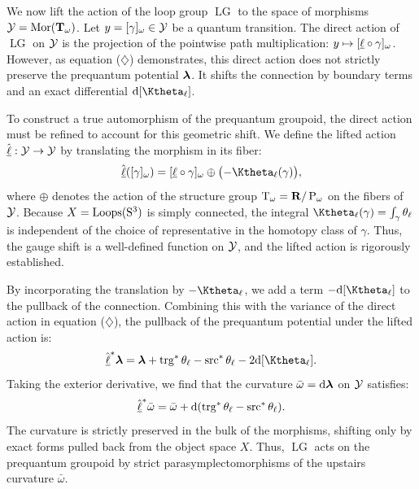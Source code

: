 \documentclass[11pt,reqno,letterpaper,twoside]{amsart}
\renewcommand{\TT}{\Groupoid{T}}
\def\u(#1){\uline{#1}}
\newcommand{\LG}{\operatorname{LG}}
\begin{document}
  We now lift the action of the loop group $\LG$ to the space of morphisms $\cY = \Mor(\TT_\omega)$.
  Let $y = [\gamma]_\omega \in \mathcal{Y}$ be a quantum transition.
  The direct action of $\LG$ on $\mathcal{Y}$ is the projection of the pointwise path multiplication:
  $y \mapsto [\u(\ell) \circ \gamma]_\omega$.
  However,
  as equation ($\diamondsuit$) demonstrates,
  this direct action does not strictly preserve the prequantum potential $\boldsymbol \lambda$.
  It shifts the connection by boundary terms and an exact differential $\der[\Ktheta_\ell]$.
  
  To construct a true automorphism of the prequantum groupoid,
  the direct action must be refined to account for this geometric shift.
  We define the lifted action $\hat{\u(\ell)}: \cY \to \cY$ by translating the morphism in its fiber:
  \[
    \hat{\u(\ell)}([\gamma]_\omega) = [\u(\ell) \circ \gamma]_\omega \oplus \bigl( - \Ktheta_\ell(\gamma) \bigr),
    \]
  where $\oplus$ denotes the action of the structure group $\mathrm{T}_\omega = {\mathbf{R}}/\operatorname{P}_\omega$ on the fibers of $\mathcal{Y}$.
  Because $X = \operatorname{Loops}(\mathrm{S}^3)$ is simply connected,
  the integral $\Ktheta_\ell(\gamma) = \int_\gamma \theta_\ell$ is independent of the choice of representative in the homotopy class of $\gamma$.
  Thus,
  the gauge shift is a well-defined function on $\mathcal{Y}$,
  and the lifted action is rigorously established.
  
  By incorporating the translation by $- \Ktheta_\ell$,
  we add a term $-\der[\Ktheta_\ell]$ to the pullback of the connection.
  Combining this with the variance of the direct action in equation ($\diamondsuit$),
  the pullback of the prequantum potential under the lifted action is:
  \[
    \hat{\u(\ell)}^*\blambda = \blambda + \Trg^*\theta_\ell - \Src^*\theta_\ell - 2\der[\Ktheta_\ell].
    \]
  Taking the exterior derivative,
  we find that the curvature $\bar{\omega} = \mathrm{d}\boldsymbol \lambda$ on $\mathcal{Y}$ satisfies:
  \[
    \hat{\u(\ell)}^*\bar{\omega} = \bar{\omega} + \der(\Trg^*\theta_\ell - \Src^*\theta_\ell).
    \]
  The curvature is strictly preserved in the bulk of the morphisms,
  shifting only by exact forms pulled back from the object space $X$.
  Thus,
  $\LG$ acts on the prequantum groupoid by strict parasymplectomorphisms of the upstairs curvature $\bar{\omega}$.
  
\end{document}
